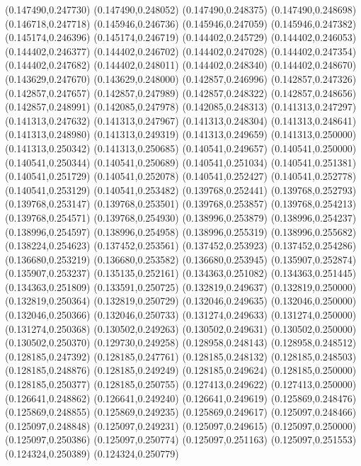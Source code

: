 (0.147490,0.247730)
(0.147490,0.248052)
(0.147490,0.248375)
(0.147490,0.248698)
(0.146718,0.247718)
(0.145946,0.246736)
(0.145946,0.247059)
(0.145946,0.247382)
(0.145174,0.246396)
(0.145174,0.246719)
(0.144402,0.245729)
(0.144402,0.246053)
(0.144402,0.246377)
(0.144402,0.246702)
(0.144402,0.247028)
(0.144402,0.247354)
(0.144402,0.247682)
(0.144402,0.248011)
(0.144402,0.248340)
(0.144402,0.248670)
(0.143629,0.247670)
(0.143629,0.248000)
(0.142857,0.246996)
(0.142857,0.247326)
(0.142857,0.247657)
(0.142857,0.247989)
(0.142857,0.248322)
(0.142857,0.248656)
(0.142857,0.248991)
(0.142085,0.247978)
(0.142085,0.248313)
(0.141313,0.247297)
(0.141313,0.247632)
(0.141313,0.247967)
(0.141313,0.248304)
(0.141313,0.248641)
(0.141313,0.248980)
(0.141313,0.249319)
(0.141313,0.249659)
(0.141313,0.250000)
(0.141313,0.250342)
(0.141313,0.250685)
(0.140541,0.249657)
(0.140541,0.250000)
(0.140541,0.250344)
(0.140541,0.250689)
(0.140541,0.251034)
(0.140541,0.251381)
(0.140541,0.251729)
(0.140541,0.252078)
(0.140541,0.252427)
(0.140541,0.252778)
(0.140541,0.253129)
(0.140541,0.253482)
(0.139768,0.252441)
(0.139768,0.252793)
(0.139768,0.253147)
(0.139768,0.253501)
(0.139768,0.253857)
(0.139768,0.254213)
(0.139768,0.254571)
(0.139768,0.254930)
(0.138996,0.253879)
(0.138996,0.254237)
(0.138996,0.254597)
(0.138996,0.254958)
(0.138996,0.255319)
(0.138996,0.255682)
(0.138224,0.254623)
(0.137452,0.253561)
(0.137452,0.253923)
(0.137452,0.254286)
(0.136680,0.253219)
(0.136680,0.253582)
(0.136680,0.253945)
(0.135907,0.252874)
(0.135907,0.253237)
(0.135135,0.252161)
(0.134363,0.251082)
(0.134363,0.251445)
(0.134363,0.251809)
(0.133591,0.250725)
(0.132819,0.249637)
(0.132819,0.250000)
(0.132819,0.250364)
(0.132819,0.250729)
(0.132046,0.249635)
(0.132046,0.250000)
(0.132046,0.250366)
(0.132046,0.250733)
(0.131274,0.249633)
(0.131274,0.250000)
(0.131274,0.250368)
(0.130502,0.249263)
(0.130502,0.249631)
(0.130502,0.250000)
(0.130502,0.250370)
(0.129730,0.249258)
(0.128958,0.248143)
(0.128958,0.248512)
(0.128185,0.247392)
(0.128185,0.247761)
(0.128185,0.248132)
(0.128185,0.248503)
(0.128185,0.248876)
(0.128185,0.249249)
(0.128185,0.249624)
(0.128185,0.250000)
(0.128185,0.250377)
(0.128185,0.250755)
(0.127413,0.249622)
(0.127413,0.250000)
(0.126641,0.248862)
(0.126641,0.249240)
(0.126641,0.249619)
(0.125869,0.248476)
(0.125869,0.248855)
(0.125869,0.249235)
(0.125869,0.249617)
(0.125097,0.248466)
(0.125097,0.248848)
(0.125097,0.249231)
(0.125097,0.249615)
(0.125097,0.250000)
(0.125097,0.250386)
(0.125097,0.250774)
(0.125097,0.251163)
(0.125097,0.251553)
(0.124324,0.250389)
(0.124324,0.250779)

